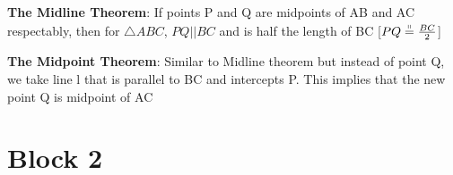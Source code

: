 \documentclass[11pt]{article}
\begin{document}
\noindent \textbf{The Midline Theorem}: If points P and Q are midpoints of AB and AC respectably, then for $\triangle ABC$, $PQ||BC$ and is half the length of BC [$PQ\overset{\shortparallel}{=}\frac{BC}{2}$]


\noindent \textbf{The Midpoint Theorem}: Similar to Midline theorem but instead of point Q, we take line l that is parallel to BC and intercepts P. This implies that the new point Q is midpoint of AC

\section{Block 2}
\subsection{}
\end{document}
